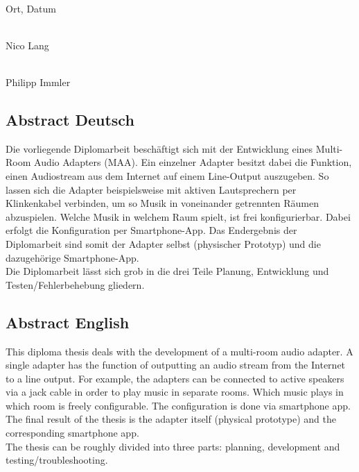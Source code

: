 \documentclass[11pt, twoside]{article}
\begin{document}
\vspace{30mm}

\noindent
\begin{minipage}[c]{5cm}
	\centering \dotfill \\
	Ort, Datum
\end{minipage}
\hfill
    \begin{minipage}[c]{5cm}
        \centering \dotfill \\
        Nico Lang
    \end{minipage}
    
\vspace{25mm}

\noindent
\begin{flushright}
    \begin{minipage}[c]{5cm}
        \centering \dotfill \\
        Philipp Immler
    \end{minipage}
\end{flushright}
\newpage
\subsection*{Abstract Deutsch}
Die vorliegende Diplomarbeit beschäftigt sich mit der Entwicklung eines Multi-Room Audio Adapters (MAA). Ein einzelner Adapter besitzt dabei die Funktion, einen Audiostream aus dem Internet auf einem Line-Output auszugeben. So lassen sich die Adapter beispielsweise mit aktiven Lautsprechern per Klinkenkabel verbinden, um so Musik in voneinander getrennten Räumen abzuspielen. Welche Musik in welchem Raum spielt, ist frei konfigurierbar. Dabei erfolgt die Konfiguration per Smartphone-App. Das Endergebnis der Diplomarbeit sind somit der Adapter selbst (physischer Prototyp) und die dazugehörige Smartphone-App. \newline \\
Die Diplomarbeit lässt sich grob in die drei Teile Planung, Entwicklung und Testen/Fehlerbehebung gliedern.
\subsection*{Abstract English}
This diploma thesis deals with the development of a multi-room audio adapter. A single adapter has the function of outputting an audio stream from the Internet to a line output. For example, the adapters can be connected to active speakers via a jack cable in order to play music in separate rooms. Which music plays in which room is freely configurable. The configuration is done via smartphone app. The final result of the thesis is the adapter itself (physical prototype) and the corresponding smartphone app. \newline \\
The thesis can be roughly divided into three parts: planning, development and testing/troubleshooting.
\end{document}

